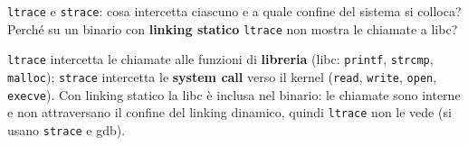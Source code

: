\question[5]
\lstinline|ltrace| e \lstinline|strace|: cosa intercetta ciascuno e a quale confine del sistema si colloca?
Perché su un binario con \textbf{linking statico} \lstinline|ltrace| non mostra le chiamate a libc?
\begin{solution}
\lstinline|ltrace| intercetta le chiamate alle funzioni di \textbf{libreria} (libc: \lstinline|printf|, \lstinline|strcmp|, \lstinline|malloc|); \lstinline|strace| intercetta le \textbf{system call} verso il kernel (\lstinline|read|, \lstinline|write|, \lstinline|open|, \lstinline|execve|).
Con linking statico la libc è inclusa nel binario: le chiamate sono interne e non attraversano il confine del linking dinamico, quindi \lstinline|ltrace| non le vede (si usano \lstinline|strace| e gdb).
\end{solution}
